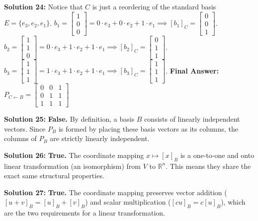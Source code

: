 \documentclass{article}
\begin{document}
\vspace{0.3cm}
\textbf{Solution 24:} Notice that $C$ is just a reordering of the standard basis $E = \{e_3, e_2, e_1\}$.
$b_1 = \begin{bmatrix} 1 \\ 0 \\ 0 \end{bmatrix} = 0 \cdot e_3 + 0 \cdot e_2 + 1 \cdot e_1 \implies [b_1]_C = \begin{bmatrix} 0 \\ 0 \\ 1 \end{bmatrix}$.
$b_2 = \begin{bmatrix} 1 \\ 1 \\ 0 \end{bmatrix} = 0 \cdot e_3 + 1 \cdot e_2 + 1 \cdot e_1 \implies [b_2]_C = \begin{bmatrix} 0 \\ 1 \\ 1 \end{bmatrix}$.
$b_3 = \begin{bmatrix} 1 \\ 1 \\ 1 \end{bmatrix} = 1 \cdot e_3 + 1 \cdot e_2 + 1 \cdot e_1 \implies [b_3]_C = \begin{bmatrix} 1 \\ 1 \\ 1 \end{bmatrix}$.
\textbf{Final Answer:} $P_{C \leftarrow B} = \begin{bmatrix} 0 & 0 & 1 \\ 0 & 1 & 1 \\ 1 & 1 & 1 \end{bmatrix}$

\vspace{0.3cm}
\textbf{Solution 25:} \textbf{False.} By definition, a basis $B$ consists of linearly independent vectors. Since $P_B$ is formed by placing these basis vectors as its columns, the columns of $P_B$ are strictly linearly independent.

\vspace{0.3cm}
\textbf{Solution 26:} \textbf{True.} The coordinate mapping $x \mapsto [x]_B$ is a one-to-one and onto linear transformation (an isomorphism) from $V$ to $\mathbb{R}^n$. This means they share the exact same structural properties.

\vspace{0.3cm}
\textbf{Solution 27:} \textbf{True.} The coordinate mapping preserves vector addition ($[u+v]_B = [u]_B + [v]_B$) and scalar multiplication ($[cu]_B = c[u]_B$), which are the two requirements for a linear transformation.
\end{document}
